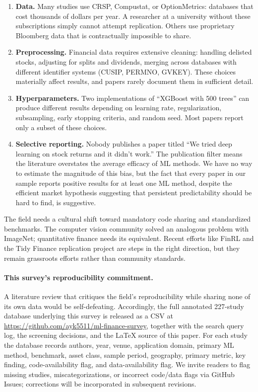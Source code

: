 \begin{enumerate}[leftmargin=*]
    \item \textbf{Data.} Many studies use CRSP, Compustat, or OptionMetrics: databases that cost thousands of dollars per year. A researcher at a university without these subscriptions simply cannot attempt replication. Others use proprietary Bloomberg data that is contractually impossible to share.

    \item \textbf{Preprocessing.} Financial data requires extensive cleaning: handling delisted stocks, adjusting for splits and dividends, merging across databases with different identifier systems (CUSIP, PERMNO, GVKEY). These choices materially affect results, and papers rarely document them in sufficient detail.

    \item \textbf{Hyperparameters.} Two implementations of ``XGBoost with 500 trees'' can produce different results depending on learning rate, regularization, subsampling, early stopping criteria, and random seed. Most papers report only a subset of these choices.

    \item \textbf{Selective reporting.} Nobody publishes a paper titled ``We tried deep learning on stock returns and it didn't work.'' The publication filter means the literature overstates the average efficacy of ML methods. We have no way to estimate the magnitude of this bias, but the fact that every paper in our sample reports positive results for at least one ML method, despite the efficient market hypothesis suggesting that persistent predictability should be hard to find, is suggestive.
\end{enumerate}

The field needs a cultural shift toward mandatory code sharing and standardized benchmarks. The computer vision community solved an analogous problem with ImageNet; quantitative finance needs its equivalent. Recent efforts like FinRL \citep{Wang2021} and the Tidy Finance replication project are steps in the right direction, but they remain grassroots efforts rather than community standards.

\paragraph{This survey's reproducibility commitment.} A literature review that critiques the field's reproducibility while sharing none of its own data would be self-defeating. Accordingly, the full annotated 227-study database underlying this survey is released as a CSV at \url{https://github.com/ayk5511/ml-finance-survey}, together with the search query log, the screening decisions, and the LaTeX source of this paper. For each study the database records authors, year, venue, application domain, primary ML method, benchmark, asset class, sample period, geography, primary metric, key finding, code-availability flag, and data-availability flag. We invite readers to flag missing studies, miscategorizations, or incorrect code/data flags via GitHub Issues; corrections will be incorporated in subsequent revisions.

